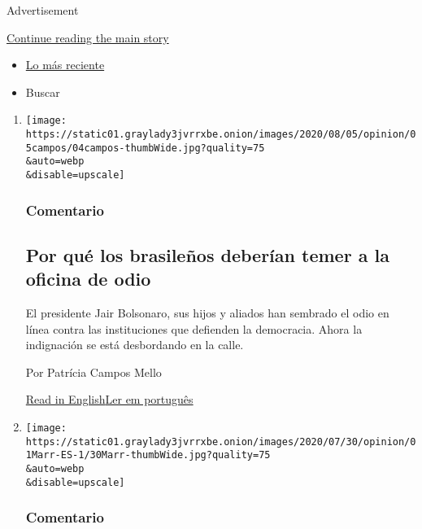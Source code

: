Advertisement

\protect\hyperlink{after-mid1}{Continue reading the main story}

\begin{itemize}
\tightlist
\item
  \protect\hyperlink{stream-panel}{Lo más reciente}
\item
  Buscar
\end{itemize}

\begin{enumerate}
\def\labelenumi{\arabic{enumi}.}
\item
  \href{/es/2020/08/04/espanol/opinion/bolsonaro-oficina-odio-brasil.html}{}

  \texttt{[image: https://static01.graylady3jvrrxbe.onion/images/2020/08/05/opinion/05campos/04campos-thumbWide.jpg?quality=75\\\&auto=webp\\\&disable=upscale]}

  \hypertarget{comentario-4}{%
  \subsubsection{Comentario}\label{comentario-4}}

  \hypertarget{por-quuxe9-los-brasileuxf1os-deberuxedan-temer-a-la-oficina-de-odio}{%
  \subsection{Por qué los brasileños deberían temer a la oficina de
  odio}\label{por-quuxe9-los-brasileuxf1os-deberuxedan-temer-a-la-oficina-de-odio}}

  El presidente Jair Bolsonaro, sus hijos y aliados han sembrado el odio
  en línea contra las instituciones que defienden la democracia. Ahora
  la indignación se está desbordando en la calle.

  Por Patrícia Campos Mello

  \href{https://www.nytimes3xbfgragh.onion/2020/08/04/opinion/bolsonaro-office-of-hate-brazil.html}{Read
  in
  English}\href{https://www.nytimes3xbfgragh.onion/pt/2020/08/04/opinion/international-world/bolsonaro-gabinete-do-odio.html}{Ler
  em português}
\item
  \href{/es/2020/08/01/espanol/opinion/coronavirus-aire.html}{}

  \texttt{[image: https://static01.graylady3jvrrxbe.onion/images/2020/07/30/opinion/01Marr-ES-1/30Marr-thumbWide.jpg?quality=75\\\&auto=webp\\\&disable=upscale]}

  \hypertarget{comentario-5}{%
  \subsubsection{Comentario}\label{comentario-5}}


\end{enumerate}

